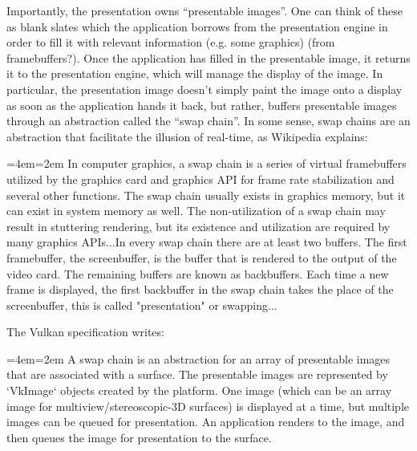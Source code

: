 \documentclass[12pt,letterpaper]{article}
\newcommand{\inquotes}[1]{``#1''}	%
\newenvironment{indenttext}{%
	\par%
	\medskip
	\leftskip=4em\rightskip=2em%
	\noindent\ignorespaces}{%
	\par\medskip}
\renewenvironment{quotation}{\begin{indenttext}\fontfamily{LinuxLibertineT-OsF}\selectfont}{\end{indenttext}}
\begin{document}
    Importantly, the presentation owns \inquotes{presentable images}. One can think of these as blank slates which the application borrows from the presentation engine in order to fill it with relevant information (e.g. some graphics) (from framebuffers?). Once the application has filled in the presentable image, it returns it to the presentation engine, which will manage the display of the image. In particular, the presentation image doesn't simply paint the image onto a display as soon as the application hands it back, but rather, buffers presentable images through an abstraction called the \inquotes{swap chain}. In some sense, swap chains are an abstraction that facilitate the illusion of real-time, as Wikipedia explains:
        \begin{quotation}
            In computer graphics, a swap chain is a series of virtual framebuffers utilized by the graphics card and graphics API for frame rate stabilization and several other functions. The swap chain usually exists in graphics memory, but it can exist in system memory as well. The non-utilization of a swap chain may result in stuttering rendering, but its existence and utilization are required by many graphics APIs...In every swap chain there are at least two buffers. The first framebuffer, the screenbuffer, is the buffer that is rendered to the output of the video card. The remaining buffers are known as backbuffers. Each time a new frame is displayed, the first backbuffer in the swap chain takes the place of the screenbuffer, this is called "presentation" or swapping...
        \end{quotation}
    The Vulkan specification writes:
        \begin{quotation}
            A swap chain is an abstraction for an array of presentable images that are associated with a surface. The presentable images are represented by `VkImage` objects created by the platform. One image (which can be an array image for multiview/stereoscopic-3D surfaces) is displayed at a time, but multiple images can be queued for presentation. An application renders to the image, and then queues the image for presentation to the surface.
        \end{quotation}
\end{document}
